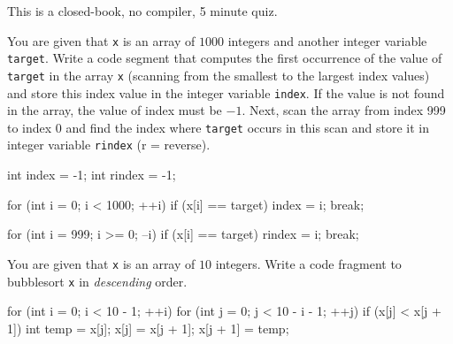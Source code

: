 

This is a closed-book, no compiler, 5 minute quiz.

\nextq
You are given that \verb!x! is an array of $1000$ integers and another
integer variable \verb!target!.
Write a code segment that computes the first occurrence of the value of
\verb!target! in the array \verb!x! (scanning from the smallest to the largest index values) and store this index value in the integer variable \verb!index!. If the value is not found in the array,  the value of index must be $-1$.
Next, scan the array from index 999 to index 0 and find the index where
\verb!target! occurs in this scan and store it in integer variable
\verb!rindex! (r = reverse).
\\
\ANSWER
\begin{answercode}
int index = -1;
int rindex = -1;

for (int i = 0; i < 1000; ++i)
{
    if (x[i] == target)
    {
        index = i;
        break;
    }
}

for (int i = 999; i >= 0; --i)
{
    if (x[i] == target)
    {
        rindex = i;
        break;
    }
}
\end{answercode}

\nextq
You are given that \verb!x! is an array of $10$ integers.
Write a code fragment to bubblesort \verb!x! in \textit{descending} order.
\\
\ANSWER
\begin{answercode}
for (int i = 0; i < 10 - 1; ++i)
{
    for (int j = 0; j < 10 - i - 1; ++j)
    {
        if (x[j] < x[j + 1]) 
        {
            int temp = x[j];
            x[j] = x[j + 1];
            x[j + 1] = temp;
        }
    }
}

\end{answercode}


